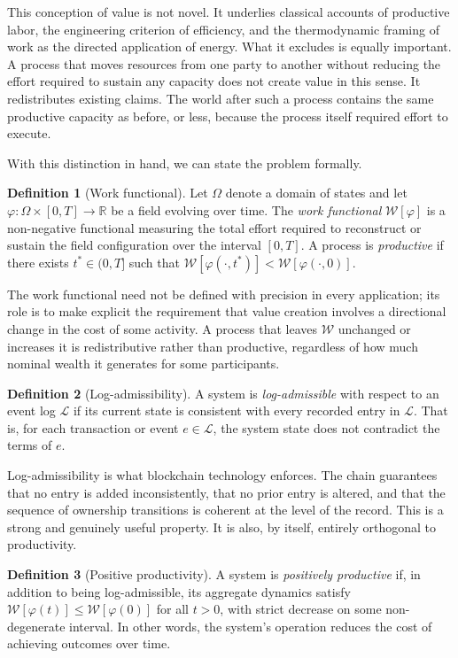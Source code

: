 \documentclass[12pt, oneside]{article}
\theoremstyle{definition}
\newtheorem{definition}{Definition}[section]
\newcommand{\field}{\varphi}
\newcommand{\Wfunc}{\mathcal{W}}
\newcommand{\Log}{\mathcal{L}}
\newcommand{\R}{\mathbb{R}}
\begin{document}
This conception of value is not novel. It underlies classical accounts of productive labor, the engineering criterion of efficiency, and the thermodynamic framing of work as the directed application of energy. What it excludes is equally important. A process that moves resources from one party to another without reducing the effort required to sustain any capacity does not create value in this sense. It redistributes existing claims. The world after such a process contains the same productive capacity as before, or less, because the process itself required effort to execute.

With this distinction in hand, we can state the problem formally.

\begin{definition}[Work functional]
Let $\Omega$ denote a domain of states and let $\field : \Omega \times [0, T] \to \R$ be a field evolving over time. The \emph{work functional} $\Wfunc[\field]$ is a non-negative functional measuring the total effort required to reconstruct or sustain the field configuration over the interval $[0, T]$. A process is \emph{productive} if there exists $t^* \in (0, T]$ such that $\Wfunc[\field(\cdot, t^*)] < \Wfunc[\field(\cdot, 0)]$.
\end{definition}

The work functional need not be defined with precision in every application; its role is to make explicit the requirement that value creation involves a directional change in the cost of some activity. A process that leaves $\Wfunc$ unchanged or increases it is redistributive rather than productive, regardless of how much nominal wealth it generates for some participants.

\begin{definition}[Log-admissibility]
A system is \emph{log-admissible} with respect to an event log $\Log$ if its current state is consistent with every recorded entry in $\Log$. That is, for each transaction or event $e \in \Log$, the system state does not contradict the terms of $e$.
\end{definition}

Log-admissibility is what blockchain technology enforces. The chain guarantees that no entry is added inconsistently, that no prior entry is altered, and that the sequence of ownership transitions is coherent at the level of the record. This is a strong and genuinely useful property. It is also, by itself, entirely orthogonal to productivity.

\begin{definition}[Positive productivity]
A system is \emph{positively productive} if, in addition to being log-admissible, its aggregate dynamics satisfy $\Wfunc[\field(t)] \leq \Wfunc[\field(0)]$ for all $t > 0$, with strict decrease on some non-degenerate interval. In other words, the system's operation reduces the cost of achieving outcomes over time.
\end{definition}
\end{document}
